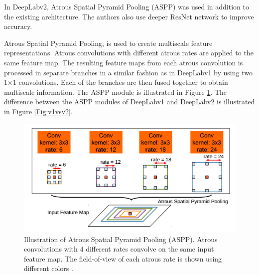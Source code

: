 In DeepLabv2, Atrous Spatial Pyramid Pooling (ASPP) was used in addition to the existing architecture. The authors also use deeper ResNet network to improve accuracy.

Atrous Spatial Pyramid Pooling, is used to create multiscale feature representations. Atrous convolutions with different atrous rates are applied to the same feature map. The resulting feature maps from each atrous convolution is processed in separate branches in a similar fashion as in DeepLabv1 by using two 1$\times$1 convolutions. Each of the branches are then fused together to obtain multiscale information. The ASPP module is illustrated in Figure \ref{Fig:aspp}. The difference between the ASPP modules of DeepLabv1 and DeepLabv2 is illustrated in Figure \ref{Fig:v1vsv2}.

	\begin{figure}
		\centering
		\includegraphics[width=0.6\linewidth]{images/aspp}
		\caption{Illustration of Atrous Spatial Pyramid Pooling (ASPP). Atrous convolutions with 4 different rates convolve on the same input feature map. The field-of-view of each atrous rate is shown using different colors \cite{DBLP:journals/corr/ChenPK0Y16}.}
		\label{Fig:aspp}
	\end{figure}
	
